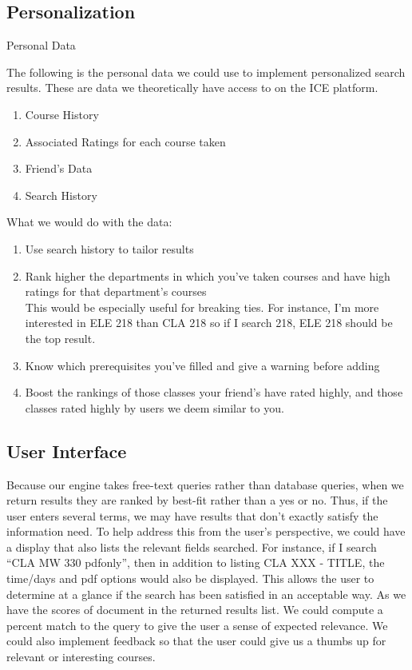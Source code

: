 \documentclass[12pt,letterpaper]{article}
\begin{document}
\subsection{Personalization}

Personal Data

The following is the personal data we could use to implement personalized search results. These are data we theoretically have access to on the ICE platform.
\begin{enumerate}
\item Course History
\item Associated Ratings for each course taken
\item Friend's Data
\item Search History
\end{enumerate}
What we would do with the data:
\begin{enumerate}
\item Use search history to tailor results

\item Rank higher the departments in which you've taken courses and have high ratings for that department's courses \\

This would be especially useful for breaking ties. For instance, I'm more interested in ELE 218 than CLA 218 so if I search 218, ELE 218 should be the top result. 

\item Know which prerequisites you've filled and give a warning before adding

\item Boost the rankings of those classes your friend's have rated highly, and those classes rated highly by users we deem similar to you.

\end{enumerate}

	
\subsection{User Interface}
Because our engine takes free-text queries rather than database queries, when we return results they are ranked by best-fit rather than a yes or no. Thus, if the user enters several terms, we may have results that don't exactly satisfy the information need.
To help address this from the user's perspective, we could have a display that also lists the relevant fields searched. For instance, if I search ``CLA MW 330 pdfonly'', then in addition to listing CLA XXX - TITLE, the time/days and pdf options would also be displayed. This allows the user to determine at a glance if the search has been satisfied in an acceptable way. 
As we have the scores of document in the returned results list. We could compute a percent match to the query to give the user a sense of expected relevance. We could also implement feedback so that the user could give us a thumbs up for relevant or interesting courses. 
\end{document}
